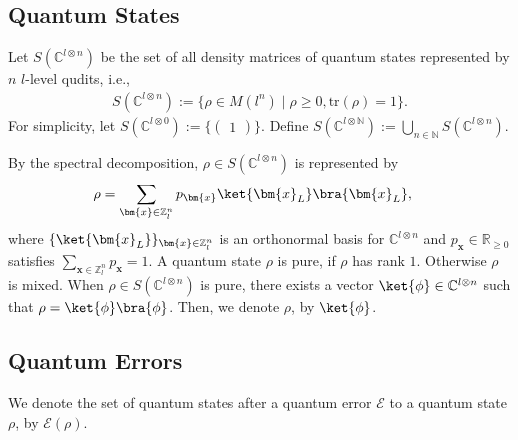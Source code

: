 \documentclass[reprint,amsmath,amssymb,aps,]{revtex4-2}
\theoremstyle{definition}
\newcommand{\SET}[1]{\mathbb{#1}}
\newcommand{\NNR}{\SET{R}_{\ge 0}}
\newcommand{\Z}{\SET{Z}}
\newcommand{\N}{\SET{N}}
\newcommand{\C}{\SET{C}}
\newcommand{\1}{\mbox{1}\hspace{-0.25em}\mbox{l}}%
\newcommand{\pure}[2]{\C^{#1 \otimes #2}}
\newcommand{\state}[2]{S(\pure{#1}{#2})}
\newcommand{\QU}[1]{\mathcal{#1}}
\begin{document}
\subsection{Quantum States \cite{lidar2013quantum}}
Let $\state{l}{n}$ be
the set of all density matrices of quantum states
represented by $n$ $l$-level qudits,
i.e.,
\begin{align*}
  \state{l}{n}
  :=
  \{
  \rho \in M(l^n)
  \mid
  \rho \ge 0,
  \text{tr}(\rho) = 1
  \}.
\end{align*}
For simplicity,
let $\state{l}{0} := \Big\{ \begin{pmatrix} 1 \end{pmatrix} \Big\}$.
Define $\state{l}{\N} := \bigcup_{n \in \N} \state{l}{n}$.

By the spectral decomposition,
$\rho \in \state{l}{n}$ is represented by
\begin{align}
  \rho
  &=
  \sum_{ \bm{x} \in \Z_l^n }
  p_{ \bm{x} } \ket{ \bm{x}_L } \bra{ \bm{x}_L },
  \label{eq:spec}
\end{align}
where
$\{ \ket{ \bm{x}_L } \}_{ \bm{x} \in \Z_l^n }$
is an orthonormal basis for $\pure{l}{n}$
and
$p_{ \bm{x} } \in \NNR$ satisfies
$\sum_{ \bm{x} \in \Z_l^n } p_{ \bm{x} } = 1$.
A quantum state $\rho$ is pure,
if $\rho$ has rank $1$.
Otherwise $\rho$ is mixed.
When $\rho \in \state{l}{n}$ is pure,
there exists a vector $\ket{\phi} \in \pure{l}{n}$
such that $\rho = \ket{\phi}\bra{\phi}$.
Then,
we denote $\rho$, by $\ket{\phi}$.

\subsection{Quantum Errors}\label{subsec:error}
We denote
the set of quantum states after a quantum error $\QU{E}$ to a quantum state $\rho$,
by $\QU{E}(\rho)$.
\end{document}
